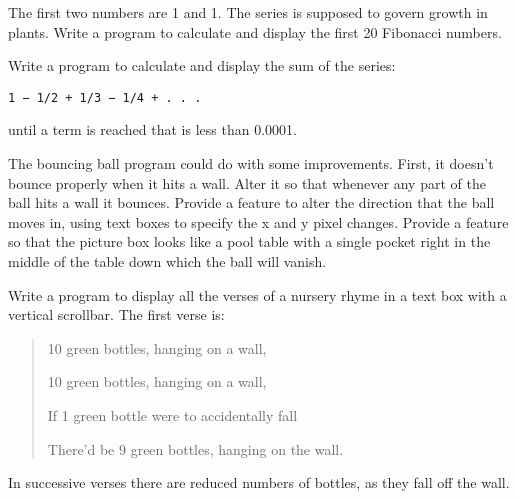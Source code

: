 \begin{EXE}
				The first two numbers are 1 and 1. The series is supposed to govern growth in plants. Write a program to calculate and display the first 20 Fibonacci numbers.
			\item	{} Write a program to calculate and display the sum of the series:
				\begin{lstlisting}
1 − 1/2 + 1/3 − 1/4 + . . .
				\end{lstlisting}
				until a term is reached that is less than 0.0001.
			\item	{} The bouncing ball program could do with some improvements. First, it doesn't bounce properly when it hits a wall. Alter it so that whenever any part of the ball hits a wall it bounces. Provide a feature to alter the direction that the ball moves in, using text boxes to specify the x and y pixel changes. Provide a feature so that the picture box looks like a pool table with a single pocket right in the middle of the table down which the ball will vanish.
			\item {} Write a program to display all the verses of a nursery rhyme in a text box with a vertical scrollbar. The first verse is:
				\begin{quote}
					10 green bottles, hanging on a wall,

					10 green bottles, hanging on a wall,

					If 1 green bottle were to accidentally fall

					There'd be 9 green bottles, hanging on the wall.
				\end{quote}
				In successive verses there are reduced numbers of bottles, as they fall off the wall.

		\end{EXE}
		
